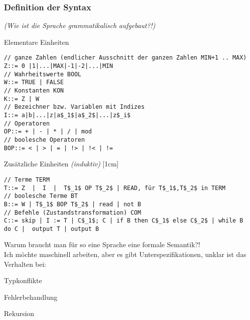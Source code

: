 \subsubsection{Definition der Syntax}
\emph{(Wie ist die Sprache grammatikalisch aufgebaut?!)}
\begin{compactitem}
	\item [Elementare Einheiten] \emph{}
	\begin{lstlisting}[mathescape]
// ganze Zahlen (endlicher Ausschnitt der ganzen Zahlen MIN+1 .. MAX)
Z::= 0 |1|...|MAX|-1|-2|...|MIN 
// Wahrheitswerte BOOL
W::= TRUE | FALSE
// Konstanten KON
K::= Z | W
// Bezeichner bzw. Variablen mit Indizes
I::= a|b|...|z|a$_1$|a$_2$|...|z$_i$
// Operatoren
OP::= + | - | * | / | mod
// boolesche Operatoren
BOP::= < | > | = | !> | !< | !=
	\end{lstlisting}
	\item [Zusätzliche Einheiten] \emph{(induktiv)}
	[1cm]
	\begin{lstlisting}[mathescape]
// Terme TERM
T::= Z  |  I  |  T$_1$ OP T$_2$ | READ, für T$_1$,T$_2$ in TERM
// boolesche Terme BT
B::= W | T$_1$ BOP T$_2$ | read | not B
// Befehle (Zustandstransformation) COM
C::= skip | I := T | C$_1$; C | if B then C$_1$ else C$_2$ | while B do C |  output T | output B
	\end{lstlisting}
\end{compactitem}
Warum braucht man für so eine Sprache eine formale Semantik?!\\
Ich möchte maschinell arbeiten, aber es gibt Unterspezifikationen, unklar ist das Verhalten bei:
\begin{compactitem}
\item Typkonflikte
\item Fehlerbehandlung
\item Rekursion
\end{compactitem}

